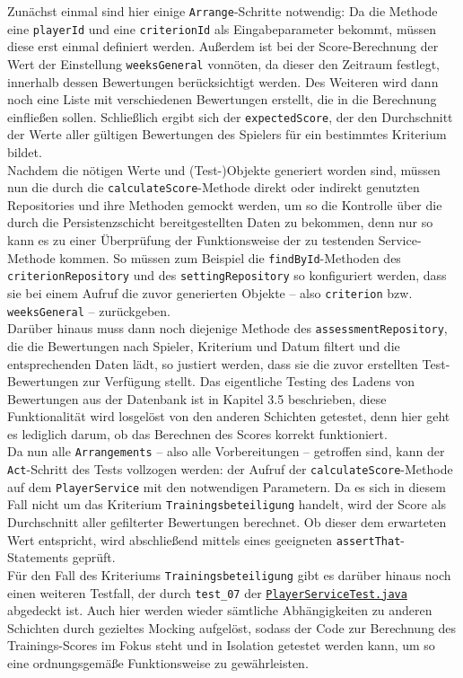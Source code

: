 Zunächst einmal sind hier einige \texttt{Arrange}-Schritte notwendig: Da die Methode 
eine \texttt{playerId} und eine \texttt{criterionId} als Eingabeparameter bekommt, 
müssen diese erst einmal definiert werden. Außerdem ist bei der Score-Berechnung 
der Wert der Einstellung \texttt{weeksGeneral} vonnöten, da dieser den Zeitraum 
festlegt, innerhalb dessen Bewertungen berücksichtigt werden. Des Weiteren wird dann 
noch eine Liste mit verschiedenen Bewertungen erstellt, die in die Berechnung 
einfließen sollen. Schließlich ergibt sich der \texttt{expectedScore}, der den 
Durchschnitt der Werte aller gültigen Bewertungen des Spielers für ein bestimmtes 
Kriterium bildet. \\ 
Nachdem die nötigen Werte und (Test-)Objekte generiert worden sind, müssen nun 
die durch die \texttt{calculateScore}-Methode direkt oder indirekt genutzten 
Repositories und ihre Methoden gemockt werden, um so die Kontrolle über die durch 
die Persistenzschicht bereitgestellten Daten zu bekommen, denn nur so kann es zu 
einer Überprüfung der Funktionsweise der zu testenden Service-Methode kommen. 
So müssen zum Beispiel die \texttt{findById}-Methoden des 
\texttt{criterionRepository} und des \texttt{settingRepository} so konfiguriert 
werden, dass sie bei einem Aufruf die zuvor generierten Objekte -- also 
\texttt{criterion} bzw. \texttt{weeksGeneral} -- zurückgeben. \\ 
Darüber hinaus muss dann noch diejenige Methode des \texttt{assessmentRepository}, 
die die Bewertungen nach Spieler, Kriterium und Datum filtert und die entsprechenden 
Daten lädt, so justiert werden, dass sie die zuvor erstellten Test-Bewertungen 
zur Verfügung stellt. Das eigentliche Testing des Ladens von Bewertungen aus der 
Datenbank ist in Kapitel 3.5 beschrieben, diese Funktionalität wird losgelöst von den 
anderen Schichten getestet, denn hier geht es lediglich darum, ob das Berechnen des 
Scores korrekt funktioniert. \\ 
Da nun alle \texttt{Arrangements} -- also alle Vorbereitungen -- getroffen sind, 
kann der \texttt{Act}-Schritt des Tests vollzogen werden: der Aufruf der 
\texttt{calculateScore}-Methode auf dem \texttt{PlayerService} mit den 
notwendigen Parametern. Da es sich in diesem Fall nicht um das Kriterium 
\texttt{Trainingsbeteiligung} handelt, wird der Score als Durchschnitt aller 
gefilterter Bewertungen berechnet. Ob dieser dem erwarteten Wert entspricht, wird 
abschließend mittels eines geeigneten \texttt{assertThat}-Statements geprüft. \\ 
Für den Fall des Kriteriums \texttt{Trainingsbeteiligung} gibt es darüber hinaus noch 
einen weiteren Testfall, der durch \texttt{test\_07} der
\href{https://github.com/FlorianOhmes/bat_spielzeitenplaner/blob/main/spielzeitenplaner/src/test/java/de/bathesis/spielzeitenplaner/services/PlayerServiceTest.java}{\texttt{PlayerServiceTest.java}}
abgedeckt ist. Auch hier werden wieder sämtliche Abhängigkeiten zu anderen Schichten 
durch gezieltes Mocking aufgelöst, sodass der Code zur Berechnung des 
Trainings-Scores im Fokus steht und in Isolation getestet werden kann, um so eine 
ordnungsgemäße Funktionsweise zu gewährleisten. 

